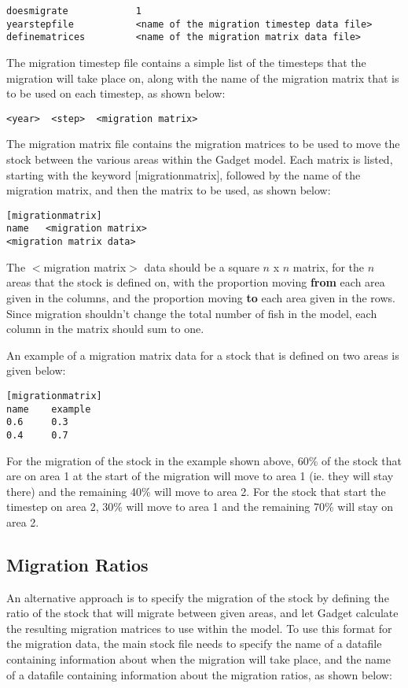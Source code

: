 \documentclass[10pt,twoside]{book}
\begin{document}
{\small\begin{verbatim}
doesmigrate            1
yearstepfile           <name of the migration timestep data file>
definematrices         <name of the migration matrix data file>
\end{verbatim}}

The migration timestep file contains a simple list of the timesteps that the migration will take place on, along with the name of the migration matrix that is to be used on each timestep, as shown below:

{\small\begin{verbatim}
<year>  <step>  <migration matrix>
\end{verbatim}}

The migration matrix file contains the migration matrices to be used to move the stock between the various areas within the Gadget model.  Each matrix is listed, starting with the keyword [migrationmatrix], followed by the name of the migration matrix, and then the matrix to be used, as shown below:

{\small\begin{verbatim}
[migrationmatrix]
name   <migration matrix>
<migration matrix data>
\end{verbatim}}

The $<$migration matrix$>$ data should be a square $n$ x $n$ matrix, for the $n$ areas that the stock is defined on, with the proportion moving {\bf from} each area given in the columns, and the proportion moving {\bf to} each area given in the rows.  Since migration shouldn't change the total number of fish in the model, each column in the matrix should sum to one.

\bigskip
An example of a migration matrix data for a stock that is defined on two areas is given below:

{\small\begin{verbatim}
[migrationmatrix]
name    example
0.6     0.3
0.4     0.7
\end{verbatim}}

For the migration of the stock in the example shown above, 60\% of the stock that are on area 1 at the start of the migration will move to area 1 (ie. they will stay there) and the remaining 40\% will move to area 2.  For the stock that start the timestep on area 2, 30\% will move to area 1 and the remaining 70\% will stay on area 2.

\subsection{Migration Ratios}
An alternative approach is to specify the migration of the stock by defining the ratio of the stock that will migrate between given areas, and let Gadget calculate the resulting migration matrices to use within the model.  To use this format for the migration data, the main stock file needs to specify the name of a datafile containing information about when the migration will take place, and the name of a datafile containing information about the migration ratios, as shown below:
\end{document}
